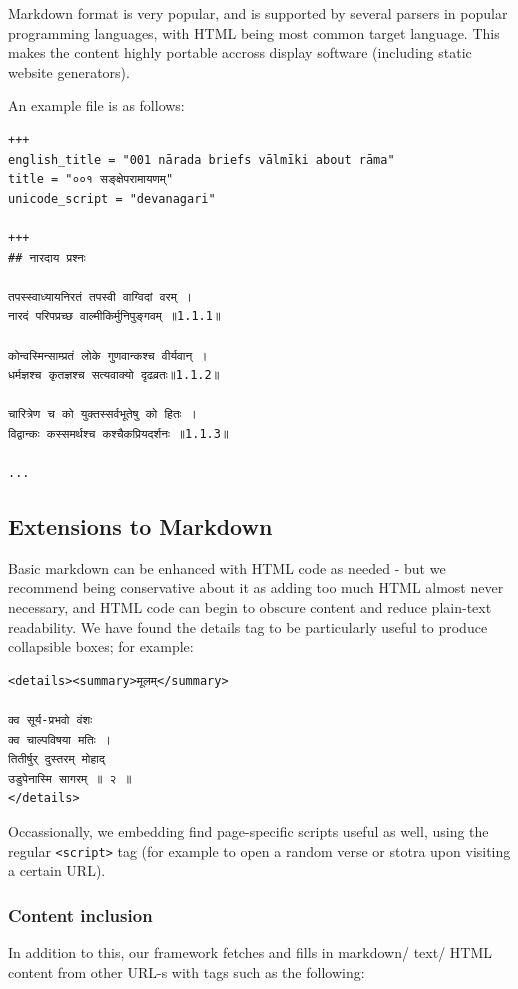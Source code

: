 \documentclass[11pt]{article}
\begin{document}
Markdown format is very popular, and is supported by several parsers in popular programming languages, with HTML being most common target language. This makes the content highly portable accross display software (including static website generators).

An example file is as follows:

\begin{verbatim}
+++
english_title = "001 nārada briefs vālmīki about rāma"
title = "००१ सङ्क्षेपरामायणम्"
unicode_script = "devanagari"

+++
## नारदाय प्रश्नः

तपस्स्वाध्यायनिरतं तपस्वी वाग्विदां वरम् ।  
नारदं परिपप्रच्छ वाल्मीकिर्मुनिपुङ्गवम् ॥1.1.1॥

कोन्वस्मिन्साम्प्रतं लोके गुणवान्कश्च वीर्यवान् ।  
धर्मज्ञश्च कृतज्ञश्च सत्यवाक्यो दृढव्रतः॥1.1.2॥

चारित्रेण च को युक्तस्सर्वभूतेषु को हितः ।  
विद्वान्कः कस्समर्थश्च कश्चैकप्रियदर्शनः ॥1.1.3॥

...
\end{verbatim}

\subsection{Extensions to Markdown}
Basic markdown can be enhanced with HTML code as needed - but we recommend being conservative about it as adding too much HTML almost never necessary, and HTML code can begin to obscure content and reduce plain-text readability. We have found the details tag to be particularly useful to produce collapsible boxes; for example:

\begin{verbatim}
<details><summary>मूलम्</summary>

क्व सूर्य-प्रभवो वंशः  
क्व चाल्पविषया मतिः ।  
तितीर्षुर् दुस्तरम् मोहाद्  
उडुपेनास्मि सागरम् ॥ २ ॥    
</details>
\end{verbatim}

Occassionally, we embedding find page-specific scripts useful as well, using the regular \verb'<script>' tag (for example to open a random verse or stotra upon visiting a certain URL).

\subsubsection{Content inclusion}
In addition to this, our framework fetches and fills in markdown/ text/ HTML content from other URL-s with tags such as the following:
\end{document}
